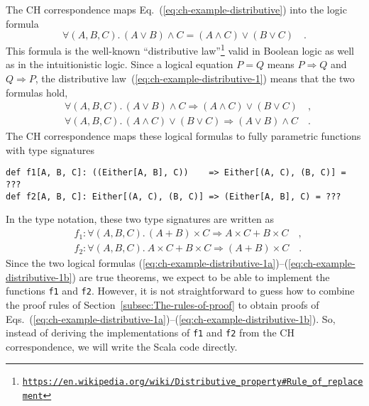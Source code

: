 The CH correspondence maps Eq.~(\ref{eq:ch-example-distributive})
into the logic formula
\begin{equation}
\forall(A,B,C).\,\left(A\vee B\right)\wedge C=\left(A\wedge C\right)\vee\left(B\vee C\right)\quad.\label{eq:ch-example-distributive-1}
\end{equation}
This formula is the well-known ``distributive law''\footnote{\texttt{\href{https://en.wikipedia.org/wiki/Distributive_property\#Rule_of_replacement}{https://en.wikipedia.org/wiki/Distributive\_property\#Rule\_of\_replacement}}}
valid in Boolean logic as well as in the intuitionistic logic. Since
a logical equation $P=Q$ means $P\Rightarrow Q$ and $Q\Rightarrow P$,
the distributive law~(\ref{eq:ch-example-distributive-1}) means
that the two formulas hold,
\begin{align}
 & \forall(A,B,C).\,\left(A\vee B\right)\wedge C\Rightarrow\left(A\wedge C\right)\vee\left(B\vee C\right)\quad,\label{eq:ch-example-distributive-1a}\\
 & \forall(A,B,C).\,\left(A\wedge C\right)\vee\left(B\vee C\right)\Rightarrow\left(A\vee B\right)\wedge C\quad.\label{eq:ch-example-distributive-1b}
\end{align}
The CH correspondence maps these logical formulas to fully parametric
functions with type signatures
\begin{lstlisting}
def f1[A, B, C]: ((Either[A, B], C))    => Either[(A, C), (B, C)] = ???
def f2[A, B, C]: Either[(A, C), (B, C)] => (Either[A, B], C) = ???
\end{lstlisting}
In the type notation, these two type signatures are written as
\begin{align*}
 & f_{1}:\forall(A,B,C).\,\left(A+B\right)\times C\Rightarrow A\times C+B\times C\quad,\\
 & f_{2}:\forall(A,B,C).\:A\times C+B\times C\Rightarrow\left(A+B\right)\times C\quad.
\end{align*}
Since the two logical formulas (\ref{eq:ch-example-distributive-1a})–(\ref{eq:ch-example-distributive-1b})
are true theorems, we expect to be able to implement the functions
\lstinline!f1! and \lstinline!f2!.
However, it is not straightforward to guess how to combine the proof
rules of Section~\ref{subsec:The-rules-of-proof} to obtain proofs
of Eqs.~(\ref{eq:ch-example-distributive-1a})–(\ref{eq:ch-example-distributive-1b}).
So, instead of deriving the implementations of \lstinline!f1!
and \lstinline!f2! from
the CH correspondence, we will write the Scala code directly.

